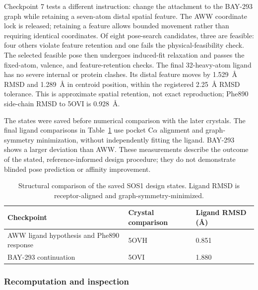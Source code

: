 \documentclass[11pt]{article}
\begin{document}
\begin{small}
Checkpoint 7 tests a different instruction: change the attachment to the BAY-293 graph while retaining a seven-atom distal spatial feature. The AWW coordinate lock is released; retaining a feature allows bounded movement rather than requiring identical coordinates. Of eight pose-search candidates, three are feasible: four others violate feature retention and one fails the physical-feasibility check. The selected feasible pose then undergoes induced-fit relaxation and passes the fixed-atom, valence, and feature-retention checks. The final 32-heavy-atom ligand has no severe internal or protein clashes. Its distal feature moves by 1.529~\AA{} RMSD and 1.289~\AA{} in centroid position, within the registered 2.25~\AA{} RMSD tolerance. This is approximate spatial retention, not exact reproduction; Phe890 side-chain RMSD to 5OVI is 0.928~\AA{}.

The states were saved before numerical comparison with the later crystals. The final ligand comparisons in Table~\ref{tab:appA_sos1_eval} use pocket C$\alpha$ alignment and graph-symmetry minimization, without independently fitting the ligand. BAY-293 shows a larger deviation than AWW. These measurements describe the outcome of the stated, reference-informed design procedure; they do not demonstrate blinded pose prediction or affinity improvement.


\begin{table}[htbp]
\centering\small
\caption{Structural comparison of the saved SOS1 design states. Ligand RMSD is receptor-aligned and graph-symmetry-minimized.}
\label{tab:appA_sos1_eval}
\begin{tabular}{@{}lll@{}}
\toprule
\textbf{Checkpoint} & \textbf{Crystal comparison} & \textbf{Ligand RMSD (\AA{})}\\
\midrule
AWW ligand hypothesis and Phe890 response & 5OVH & 0.851\\
BAY-293 continuation & 5OVI & 1.880\\
\bottomrule
\end{tabular}
\end{table}

\subsubsection{Recomputation and inspection}


\end{small}
\end{document}
